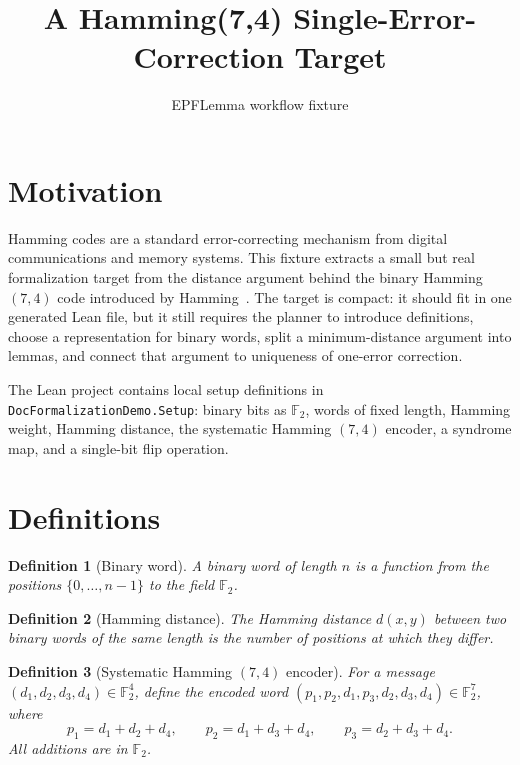 \documentclass{article}
\title{A Hamming(7,4) Single-Error-Correction Target}
\author{EPFLemma workflow fixture}
\date{}
\newtheorem{definition}{Definition}
\begin{document}
\maketitle

\section{Motivation}

Hamming codes are a standard error-correcting mechanism from digital
communications and memory systems.  This fixture extracts a small but real
formalization target from the distance argument behind the binary Hamming
$(7,4)$ code introduced by Hamming~\cite{hamming1950}.  The target is compact:
it should fit in one generated Lean file, but it still requires the planner to
introduce definitions, choose a representation for binary words, split a
minimum-distance argument into lemmas, and connect that argument to uniqueness
of one-error correction.

The Lean project contains local setup definitions in
\texttt{DocFormalizationDemo.Setup}: binary bits as $\mathbb{F}_2$, words of
fixed length, Hamming weight, Hamming distance, the systematic Hamming $(7,4)$
encoder, a syndrome map, and a single-bit flip operation.

\section{Definitions}

\begin{definition}[Binary word]\label{def:binary_word}
A binary word of length $n$ is a function from the positions
$\{0,\ldots,n-1\}$ to the field $\mathbb{F}_2$.
\end{definition}

\begin{definition}[Hamming distance]\label{def:hamming_distance}
The Hamming distance $d(x,y)$ between two binary words of the same length is
the number of positions at which they differ.
\end{definition}

\begin{definition}[Systematic Hamming $(7,4)$ encoder]\label{def:hamming74_encoder}
For a message $(d_1,d_2,d_3,d_4) \in \mathbb{F}_2^4$, define the encoded word
$(p_1,p_2,d_1,p_3,d_2,d_3,d_4) \in \mathbb{F}_2^7$, where
\[
  p_1 = d_1+d_2+d_4,\qquad
  p_2 = d_1+d_3+d_4,\qquad
  p_3 = d_2+d_3+d_4.
\]
All additions are in $\mathbb{F}_2$.
\end{definition}
\end{document}
